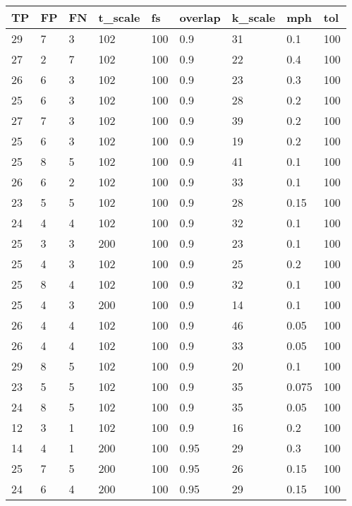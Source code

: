 \begin{table}[!ht]
    \centering
    \begin{tabular}{|l|l|l|l|l|l|l|l|l|}
    \hline
        TP & FP & FN & t\_scale & fs & overlap & k\_scale & mph & tol \\ \hline
		29 & 7 & 3 & 102 & 100 & 0.9 & 31 & 0.1 & 100 \\ \hline
        27 & 2 & 7 & 102 & 100 & 0.9 & 22 & 0.4 & 100 \\ \hline
        26 & 6 & 3 & 102 & 100 & 0.9 & 23 & 0.3 & 100 \\ \hline
        25 & 6 & 3 & 102 & 100 & 0.9 & 28 & 0.2 & 100 \\ \hline
        27 & 7 & 3 & 102 & 100 & 0.9 & 39 & 0.2 & 100 \\ \hline
        25 & 6 & 3 & 102 & 100 & 0.9 & 19 & 0.2 & 100 \\ \hline
        25 & 8 & 5 & 102 & 100 & 0.9 & 41 & 0.1 & 100 \\ \hline
        26 & 6 & 2 & 102 & 100 & 0.9 & 33 & 0.1 & 100 \\ \hline
        23 & 5 & 5 & 102 & 100 & 0.9 & 28 & 0.15 & 100 \\ \hline
        24 & 4 & 4 & 102 & 100 & 0.9 & 32 & 0.1 & 100 \\ \hline
        25 & 3 & 3 & 200 & 100 & 0.9 & 23 & 0.1 & 100 \\ \hline
        25 & 4 & 3 & 102 & 100 & 0.9 & 25 & 0.2 & 100 \\ \hline
        25 & 8 & 4 & 102 & 100 & 0.9 & 32 & 0.1 & 100 \\ \hline
        25 & 4 & 3 & 200 & 100 & 0.9 & 14 & 0.1 & 100 \\ \hline
        26 & 4 & 4 & 102 & 100 & 0.9 & 46 & 0.05 & 100 \\ \hline
        26 & 4 & 4 & 102 & 100 & 0.9 & 33 & 0.05 & 100 \\ \hline
       	29 & 8 & 5 & 102 & 100 & 0.9 & 20 & 0.1 & 100 \\ \hline
        23 & 5 & 5 & 102 & 100 & 0.9 & 35 & 0.075 & 100 \\ \hline
        24 & 8 & 5 & 102 & 100 & 0.9 & 35 & 0.05 & 100 \\ \hline
        12 & 3 & 1 & 102 & 100 & 0.9 & 16 & 0.2 & 100 \\ \hline
        14 & 4 & 1 & 200 & 100 & 0.95 & 29 & 0.3 & 100 \\ \hline
        25 & 7 & 5 & 200 & 100 & 0.95 & 26 & 0.15 & 100 \\ \hline
        24 & 6 & 4 & 200 & 100 & 0.95 & 29 & 0.15 & 100 \\ \hline

\end{tabular}
\end{table}
